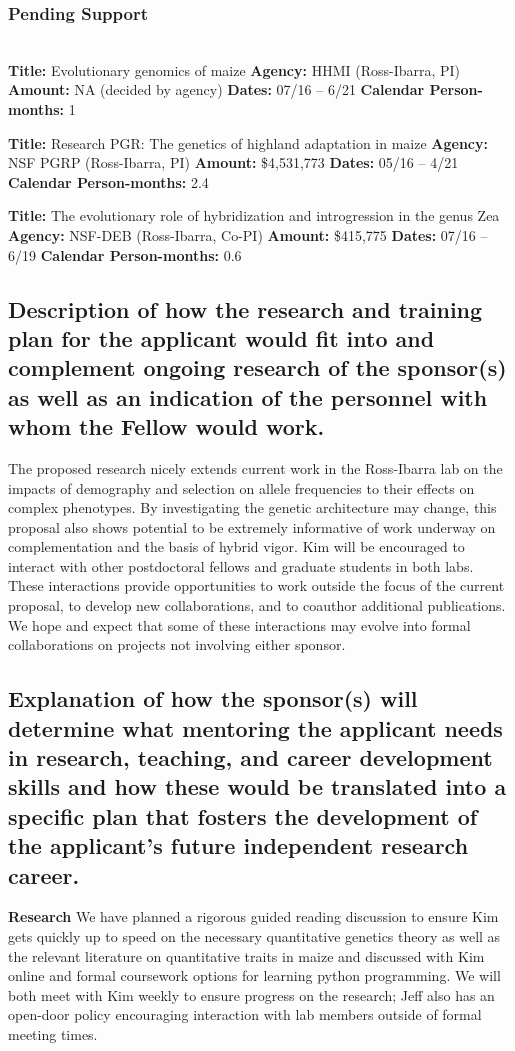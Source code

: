 \subsubsection*{Pending Support}\\ 
\noindent\textbf{Title:} Evolutionary genomics of maize 
\textbf{Agency:} HHMI (Ross-Ibarra, PI)
\textbf{Amount:} NA (decided by agency)
\textbf{Dates:} 07/16 – 6/21
\textbf{Calendar Person-months:} 1

\noindent\textbf{Title:} Research PGR: The genetics of highland adaptation in maize
\textbf{Agency:} NSF PGRP (Ross-Ibarra, PI)
\textbf{Amount:} \$4,531,773
\textbf{Dates:} 05/16 – 4/21
\textbf{Calendar Person-months:} 2.4

\noindent\textbf{Title:} The evolutionary role of hybridization and introgression in the genus Zea
\textbf{Agency:} NSF-DEB (Ross-Ibarra, Co-PI)
\textbf{Amount:} \$415,775
\textbf{Dates:} 07/16 – 6/19
\textbf{Calendar Person-months:} 0.6

\subsection{Description of how the research and training plan for the applicant would fit into and complement ongoing research of the sponsor(s) as well as an indication of the personnel with whom the Fellow would work.}

The proposed research nicely extends current work in the Ross-Ibarra lab on the impacts of demography and selection on allele frequencies to their effects on complex phenotypes. By investigating the genetic architecture may change, this proposal also shows potential to be extremely informative of work underway on complementation and the basis of hybrid vigor.  
Kim will be encouraged to interact with other postdoctoral fellows and graduate students in both labs.  These interactions provide opportunities to work outside the focus of the current proposal, to develop new collaborations, and to coauthor additional publications.  We hope and expect that some of these interactions may evolve into formal collaborations on projects not involving either sponsor.  

\subsection{Explanation of how the sponsor(s) will determine what mentoring the applicant needs in research, teaching, and career development skills and how these would be translated into a specific plan that fosters the development of the applicant's future independent research career.}
\textbf{Research} We have planned a rigorous guided reading discussion to ensure Kim gets quickly up to speed on the necessary quantitative genetics theory as well as the relevant literature on quantitative traits in maize and discussed with Kim online and formal coursework options for learning python programming. We will both meet with Kim weekly to ensure progress on the research; Jeff also has an open-door policy encouraging interaction with lab members outside of formal meeting times. 

